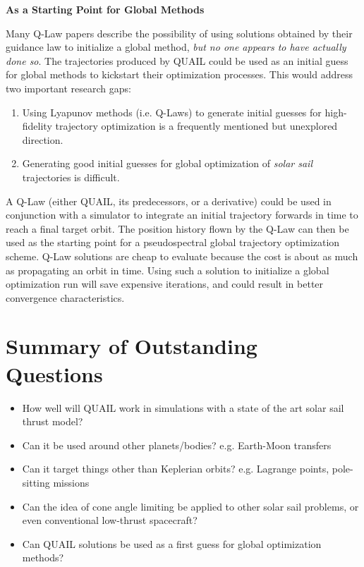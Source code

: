 \textbf{As a Starting Point for Global Methods}

Many Q-Law papers describe the possibility of using solutions obtained by their guidance law to initialize a global method, \textit{but no one appears to have actually done so}. The trajectories produced by QUAIL could be used as an initial guess for global methods to kickstart their optimization processes. This would address two important research gaps:

\begin{enumerate}
    \item Using Lyapunov methods (i.e. Q-Laws) to generate initial guesses for high-fidelity trajectory optimization is a frequently mentioned but unexplored direction.
    \item Generating good initial guesses for global optimization of \textit{solar sail} trajectories is difficult.
\end{enumerate}

A Q-Law (either QUAIL, its predecessors, or a derivative) could be used in conjunction with a simulator to integrate an initial trajectory forwards in time to reach a final target orbit. The position history flown by the Q-Law can then be used as the starting point for a pseudospectral global trajectory optimization scheme. Q-Law solutions are cheap to evaluate because the cost is about as much as propagating an orbit in time. Using such a solution to initialize a global optimization run will save expensive iterations, and could result in better convergence characteristics.

\section{Summary of Outstanding Questions}
\begin{itemize}
    \item How well will QUAIL work in simulations with a state of the art solar sail thrust model?
    \item Can it be used around other planets/bodies? e.g. Earth-Moon transfers
    \item Can it target things other than Keplerian orbits? e.g. Lagrange points, pole-sitting missions
    \item Can the idea of cone angle limiting be applied to other solar sail problems, or even conventional low-thrust spacecraft?
    \item Can QUAIL solutions be used as a first guess for global optimization methods?
\end{itemize}


